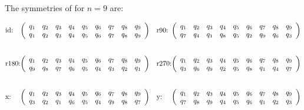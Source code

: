 \documentclass{cons-beamer}
\newcommand{\nqueensProblem}{\problemClass{NQueens}}
\begin{document}
\begin{frame}
  \begin{example}[Variable symmetry: $\nqueensProblem$ for $n=9$]
    The symmetries of \nqueensProblem for $n=9$ are:

    \scriptsize
    \[
      \begin{array}{@{}ll@{}}
        \makebox[2em][l]{\text{id:}}
        \left(
          \begin{array}{ccccccccc}
            q_1 & q_2 & q_3 & q_4 & q_5 & q_6 & q_7 & q_8 & q_9 \\
            q_1 & q_2 & q_3 & q_4 & q_5 & q_6 & q_7 & q_8 & q_9
          \end{array}
        \right) &
        \makebox[2em][l]{\text{r90:}}
        \left(
          \begin{array}{ccccccccc}
            q_1 & q_2 & q_3 & q_4 & q_5 & q_6 & q_7 & q_8 & q_9 \\
            q_7 & q_4 & q_1 & q_8 & q_5 & q_2 & q_9 & q_6 & q_3
          \end{array}
        \right) \\[3em]

        \makebox[2em][l]{\text{r180:}}
        \left(
          \begin{array}{ccccccccc}
            q_1 & q_2 & q_3 & q_4 & q_5 & q_6 & q_7 & q_8 & q_9 \\
            q_9 & q_8 & q_7 & q_6 & q_5 & q_4 & q_3 & q_2 & q_1
          \end{array}
        \right) &
        \makebox[2em][l]{\text{r270:}}
        \left(
          \begin{array}{ccccccccc}
            q_1 & q_2 & q_3 & q_4 & q_5 & q_6 & q_7 & q_8 & q_9 \\
            q_3 & q_6 & q_9 & q_2 & q_5 & q_8 & q_1 & q_4 & q_7
          \end{array}
        \right) \\[3em]

        \makebox[2em][l]{\text{x:}}
        \left(
          \begin{array}{ccccccccc}
            q_1 & q_2 & q_3 & q_4 & q_5 & q_6 & q_7 & q_8 & q_9 \\
            q_3 & q_2 & q_1 & q_6 & q_5 & q_4 & q_9 & q_8 & q_7
          \end{array}
        \right) &
        \makebox[2em][l]{\text{y:}}
        \left(
          \begin{array}{ccccccccc}
            q_1 & q_2 & q_3 & q_4 & q_5 & q_6 & q_7 & q_8 & q_9 \\
            q_7 & q_8 & q_9 & q_4 & q_5 & q_6 & q_1 & q_2 & q_3
          \end{array}
        \right) \\[3em]


\end{array}\]
\end{example}
\end{frame}
\end{document}
